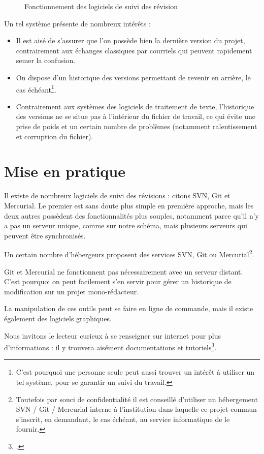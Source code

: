 \begin{figure}[ht]
\centering

\caption{Fonctionnement des logiciels de suivi des révision}\label{svn}
\end{figure}

Un tel système présente de nombreux intérêts :
\begin{itemize}
\item Il est aisé de s'assurer que l'on possède bien la dernière version du projet, contrairement aux échanges classiques par courriels qui peuvent rapidement semer la confusion.
\item On dispose d'un historique des versions permettant de revenir en arrière, le cas échéant\footnote{C'est pourquoi une personne seule peut aussi trouver un intérêt à utiliser un tel système, pour se garantir un suivi du travail.}.
\item Contrairement aux systèmes des logiciels de traitement de texte, l'historique des versions ne se situe pas à l'intérieur du fichier de travail, ce qui évite une prise de poids et un certain nombre de problèmes (notamment ralentissement et corruption du fichier).
\end{itemize}


\section{Mise en pratique}
Il existe de nombreux logiciels de suivi des révisions  : citons SVN, Git et Mercurial. Le premier est sans doute plus simple en première approche, mais les deux autres possèdent des fonctionnalités plus souples, notamment parce qu'il n'y a pas un serveur unique, comme sur notre schéma, mais plusieurs serveurs qui peuvent être synchronisés.

Un certain nombre d'hébergeurs proposent des services SVN, Git ou Mercurial\footnote{Toutefois par souci de confidentialité il est conseillé d'utiliser un hébergement SVN / Git / Mercurial interne à l'institution dans laquelle ce projet commun s'inscrit, en demandant, le cas échéant, au service informatique de le fournir.}. 

Git et Mercurial ne fonctionnent pas nécessairement avec un serveur distant. C'est pourquoi on peut facilement s'en servir pour gérer un historique de modification sur un projet mono-rédacteur.

La manipulation de ces outils peut se faire en ligne de commande, mais il existe également des logiciels graphiques.

Nous invitons le lecteur curieux à se renseigner sur internet pour plus d'informations : il y trouvera aisément documentations et tutoriels\footcite[Nous recommandons, pour Git, cet excellent livre :][]{progit}.
